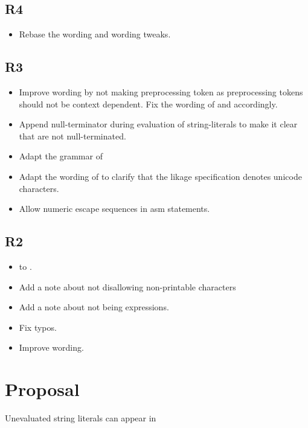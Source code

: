 \documentclass{wg21}
\begin{document}
\subsection{R4}
\begin{itemize}
    \item Rebase the wording and wording tweaks.
\end{itemize}

\subsection{R3}
\begin{itemize}
    \item Improve wording by not making  preprocessing token as preprocessing tokens should not be context dependent. Fix the wording of  and  accordingly.
    \item Append null-terminator during evaluation of string-literals to make it clear that  are not null-terminated.
    \item Adapt the grammar of 
    \item Adapt the wording of  to clarify that the likage specification denotes unicode characters.
    \item Allow numeric escape sequences in asm statements.
\end{itemize}
\subsection{R2}
\begin{itemize}
    \item {} to .
    \item Add a note about not disallowing non-printable characters
    \item Add a note about  not being expressions.
    \item Fix typos.
    \item Improve wording.
\end{itemize}

\section{Proposal}

Unevaluated string literals can appear in
\end{document}
